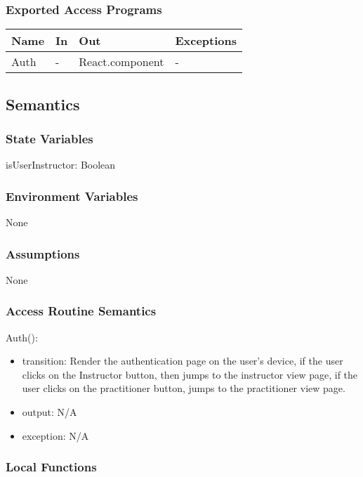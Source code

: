 \documentclass[12pt, titlepage]{article}
\begin{document}
\subsubsection{Exported Access Programs}
\begin{table}[h!]
  \centering
  \begin{tabular}{llll}
    \toprule
    \textbf{Name} & \textbf{In} & \textbf{Out}             & \textbf{Exceptions} \\
    \midrule
    Auth          & -           & React.component          & -                   \\
    \bottomrule
  \end{tabular}
\end{table}

\subsection{Semantics}

\subsubsection{State Variables}
isUserInstructor: Boolean

\subsubsection{Environment Variables}
None

\subsubsection{Assumptions}
None

\subsubsection{Access Routine Semantics}

\noindent Auth():
\begin{itemize}
  \item transition: Render the authentication page on the user's device, if the user clicks on the Instructor button, then jumps to the instructor view page, if the user clicks on the practitioner button, jumps to the practitioner view page.
  \item output: N/A
  \item exception: N/A
\end{itemize}

\subsubsection{Local Functions}
\end{document}
